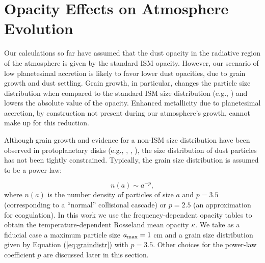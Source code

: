 \documentclass[apj]{emulateapj}
\begin{document}
%
%


\section{Opacity Effects on Atmosphere Evolution}
\label{sec:opacity}


Our calculations so far have assumed that the dust opacity in the radiative region of the atmosphere is given by the standard ISM opacity. However, our scenario of low planetesimal accretion is likely to favor lower dust opacities, due to grain growth and dust settling. Grain growth, in particular, changes the particle size distribution when compared to the standard ISM size distribution (e.g., \citealt{pollack85}) and lowers the absolute value of the opacity. Enhanced metallicity due to planetesimal accretion, by construction not present during our atmosphere's growth, cannot make up for this reduction.


Although grain growth and evidence for a non-ISM size distribution have been observed in protoplanetary disks (e.g., \citealt{beckwith90}, \citealt{beckwith91}, \citealt{perez12}), the size distribution of dust particles has not been tightly constrained. Typically, the grain size distribution is assumed to be a power-law: 

\begin{equation}
\label{eq:graindistr}
n(a) \sim a^{-p},
\end{equation}
where $n(a)$ is the number density of particles of size $a$ and $p=3.5$ (corresponding to a ``normal'' collisional cascade) or $p=2.5$ (an approximation for coagulation). In this work we use the  \citet{dalessio01} frequency-dependent opacity tables to obtain the temperature-dependent Rosseland mean opacity $\kappa$. We take as a fiducial case a maximum particle size $a_{\rm max}=1$ cm and a grain size distribution given by Equation (\ref{eq:graindistr}) with $p=3.5$. Other choices for the power-law coefficient $p$ are discussed later in this section. 
\end{document}
